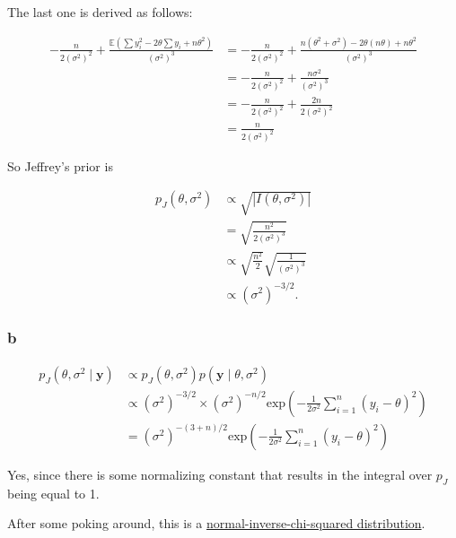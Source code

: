 \documentclass[]{article}
\begin{document}
The last one is derived as follows:

\begin{align}
-\frac{n}{2(\sigma^2)^2} + \frac{\mathbb{E}(\sum y_i^2 - 2\theta\sum y_i + n\theta^2)}{(\sigma^2)^3} &= -\frac{n}{2(\sigma^2)^2} + \frac{n(\theta^2 + \sigma^2) - 2\theta(n\theta) + n\theta^2}{(\sigma^2)^3} \\
&= -\frac{n}{2(\sigma^2)^2} + \frac{n\sigma^2}{(\sigma^2)^3} \\
&= -\frac{n}{2(\sigma^2)^2} + \frac{2n}{2(\sigma^2)^2} \\
&= \frac{n}{2(\sigma^2)^2}
\end{align}

So Jeffrey's prior is

\begin{align}
p_J(\theta, \sigma^2) &\propto \sqrt{|I(\theta, \sigma^2)|} \\
&= \sqrt{\frac{n^2}{2(\sigma^2)^3}} \\
&\propto \sqrt{\frac{n^2}{2}} \sqrt{\frac{1}{(\sigma^2)^3}} \\
&\propto (\sigma^2)^{-3/2}.
\end{align}

\hypertarget{b-1}{%
\subsubsection{b}\label{b-1}}

\begin{align}
p_J(\theta, \sigma^2 \mid \mathbf{y}) &\propto p_J(\theta, \sigma^2) p(\mathbf{y} \mid \theta, \sigma^2) \\
&\propto (\sigma^2)^{-3/2} \times (\sigma^2)^{-n/2} \text{exp}\left(-\frac{1}{2\sigma^2} \sum_{i = 1}^n (y_i - \theta)^2 \right) \\
&= (\sigma^2)^{-(3 + n)/2} \text{exp}\left(-\frac{1}{2\sigma^2} \sum_{i = 1}^n (y_i - \theta)^2 \right)
\end{align}

Yes, since there is some normalizing constant that results in the
integral over \(p_J\) being equal to 1.

After some poking around, this is a
\href{https://www2.stat.duke.edu/courses/Fall10/sta114/notes15.pdf}{normal-inverse-chi-squared
distribution}.
\end{document}
